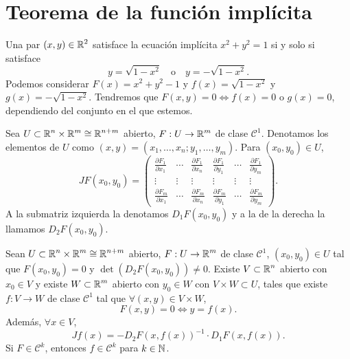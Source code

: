 \section{Teorema de la función implícita}
\begin{eg}
Una par $\displaystyle \left(x,y\right) \in \mathbb{R}^{2} $ satisface la ecuación implícita $\displaystyle x^{2}+y^{2} = 1 $ si y solo si satisface
\[y = \sqrt{1-x^{2}} \quad \text{o} \quad y = -\sqrt{1-x^{2}} .\]
Podemos considerar $\displaystyle F\left(x\right) = x^{2}+y^{2}-1 $ y $\displaystyle f\left(x\right) = \sqrt{1-x^{2}} $ y $\displaystyle g\left(x\right)= -\sqrt{1-x^{2}} $. Tendremos que $\displaystyle F\left(x,y\right) = 0 \iff f\left(x\right) = 0  $ o $\displaystyle g\left(x\right) = 0 $, dependiendo del conjunto en el que estemos.
\end{eg}
\begin{notation}
Sea $\displaystyle U \subset \mathbb{R}^{n} \times \mathbb{R}^{m}\cong\mathbb{R}^{n+m} $ abierto, $\displaystyle F: U \to \mathbb{R}^{m} $ de clase $\displaystyle \mathcal{C}^{1} $. Denotamos los elementos de $\displaystyle U $ como $\displaystyle \left(x,y\right) = \left(x_{1}, \ldots, x_{n} ; y_{1}, \ldots, y_{m}\right) $. Para $\displaystyle \left(x_{0}, y_{0}\right) \in U $,
\[JF\left(x_{0}, y_{0}\right) = \begin{pmatrix} \frac{\partial F_{1}}{\partial x_{1}} & \cdots & \frac{\partial F_{1}}{\partial x_{n}} & \frac{\partial F_{1}}{\partial y_{1}} & \cdots & \frac{\partial F_{1}}{\partial y_{m}} \\ \vdots & \vdots & \vdots & \vdots & \vdots & \vdots \\ \frac{\partial F_{m}}{\partial x_{1}} & \cdots & \frac{\partial F_{m}}{\partial x_{n}} & \frac{\partial F_{m}}{\partial y_{1}} & \cdots & \frac{\partial F_{m}}{\partial y_{m}} \end{pmatrix} .\]
A la submatriz izquierda la denotamos $\displaystyle D_{1}F\left(x_{0}, y_{0}\right) $ y a la de la derecha la llamamos $\displaystyle D_{2}F\left(x_{0}, y_{0}\right) $. 
\end{notation}
\begin{theorem}
Sean $\displaystyle U \subset \mathbb{R}^{n} \times \mathbb{R}^{m} \cong \mathbb{R}^{n+m} $ abierto, $\displaystyle F : U \to \mathbb{R}^{m} $ de clase $\displaystyle \mathcal{C}^{1} $, $\displaystyle \left(x_{0}, y_{0}\right) \in U $ tal que $\displaystyle F\left(x_{0}, y_{0}\right) = 0 $ y $\displaystyle \det\left(D_{2}F\left(x_{0}, y_{0}\right)\right) \neq 0 $. 
Existe $\displaystyle V \subset \mathbb{R}^{n} $ abierto con $\displaystyle x_{0} \in V $ y existe $\displaystyle W \subset \mathbb{R}^{m} $ abierto con $\displaystyle y_{0} \in W $ con $\displaystyle V \times W \subset U $, tales que existe $\displaystyle f : V \to W $ de clase $\displaystyle \mathcal{C}^{1} $ tal que $\displaystyle \forall \left(x,y\right) \in V \times W $,
\[ F\left(x,y\right) = 0 \iff y = f\left(x\right).\]
Además, $\displaystyle \forall x \in V $,
\[Jf\left(x\right) = -D_{2}F\left(x,f\left(x\right)\right)^{-1} \cdot D_{1}F\left(x,f\left(x\right)\right) .\]
Si $\displaystyle F \in \mathcal{C}^{k} $, entonces $\displaystyle f \in \mathcal{C}^{k} $ para $\displaystyle k \in \mathbb{N} $.
\end{theorem}
